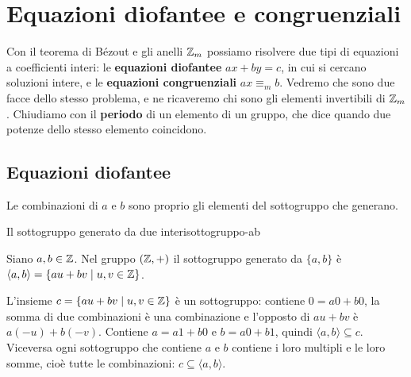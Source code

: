 \chapter{Equazioni diofantee e congruenziali}\label{cap:diofantee}

Con il teorema di Bézout e gli anelli $\mathbb{Z}_m$ possiamo risolvere due tipi di equazioni a coefficienti interi: le
\textbf{equazioni diofantee} $ax + by = c$, in cui si cercano soluzioni intere, e le \textbf{equazioni congruenziali} $ax \equiv_m b$. Vedremo
che sono due facce dello stesso problema, e ne ricaveremo chi sono gli elementi invertibili di $\mathbb{Z}_m$. Chiudiamo con il
\textbf{periodo} di un elemento di un gruppo, che dice quando due potenze dello stesso elemento coincidono.

\section{Equazioni diofantee}\label{sec:diofantee}


Le combinazioni di $a$ e $b$ sono proprio gli elementi del sottogruppo che generano.

\begin{concetto}
\begin{Lemma}{Il sottogruppo generato da due interi}{sottogruppo-ab}
    \begin{prerequisiti}
    \end{prerequisiti}
    Siano $a, b \in \mathbb{Z}$. Nel gruppo $(\mathbb{Z}, +)$ il sottogruppo generato da $\{a, b\}$ è $\langle a, b \rangle = \{au + bv \mid u, v \in \mathbb{Z}\}$.
\end{Lemma}
\begin{dimostrazione}
    L'insieme $c = \{au + bv \mid u, v \in \mathbb{Z}\}$ è un sottogruppo: contiene $0 = a0 + b0$, la somma di due combinazioni è una combinazione
    e l'opposto di $au + bv$ è $a(-u) + b(-v)$. Contiene $a = a1 + b0$ e $b = a0 + b1$, quindi $\langle a, b \rangle \subseteq c$. Viceversa ogni
    sottogruppo che contiene $a$ e $b$ contiene i loro multipli e le loro somme, cioè tutte le combinazioni: $c \subseteq \langle a, b \rangle$.
\end{dimostrazione}
\end{concetto}


